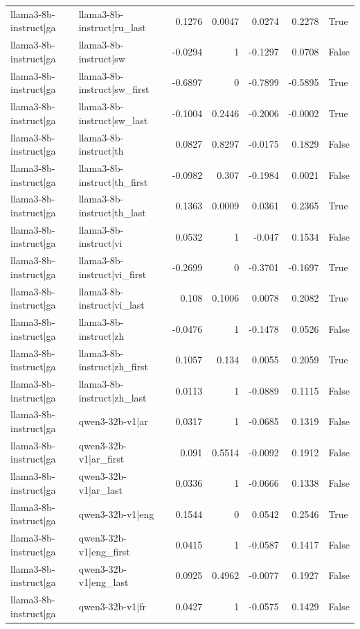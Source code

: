 \begin{table}
\begin{tabular}{l l r r r r l}
llama3-8b-instruct|ga & llama3-8b-instruct|ru_last & 0.1276 & 0.0047 & 0.0274 & 0.2278 & True \\
llama3-8b-instruct|ga & llama3-8b-instruct|sw & -0.0294 & 1 & -0.1297 & 0.0708 & False \\
llama3-8b-instruct|ga & llama3-8b-instruct|sw_first & -0.6897 & 0 & -0.7899 & -0.5895 & True \\
llama3-8b-instruct|ga & llama3-8b-instruct|sw_last & -0.1004 & 0.2446 & -0.2006 & -0.0002 & True \\
llama3-8b-instruct|ga & llama3-8b-instruct|th & 0.0827 & 0.8297 & -0.0175 & 0.1829 & False \\
llama3-8b-instruct|ga & llama3-8b-instruct|th_first & -0.0982 & 0.307 & -0.1984 & 0.0021 & False \\
llama3-8b-instruct|ga & llama3-8b-instruct|th_last & 0.1363 & 0.0009 & 0.0361 & 0.2365 & True \\
llama3-8b-instruct|ga & llama3-8b-instruct|vi & 0.0532 & 1 & -0.047 & 0.1534 & False \\
llama3-8b-instruct|ga & llama3-8b-instruct|vi_first & -0.2699 & 0 & -0.3701 & -0.1697 & True \\
llama3-8b-instruct|ga & llama3-8b-instruct|vi_last & 0.108 & 0.1006 & 0.0078 & 0.2082 & True \\
llama3-8b-instruct|ga & llama3-8b-instruct|zh & -0.0476 & 1 & -0.1478 & 0.0526 & False \\
llama3-8b-instruct|ga & llama3-8b-instruct|zh_first & 0.1057 & 0.134 & 0.0055 & 0.2059 & True \\
llama3-8b-instruct|ga & llama3-8b-instruct|zh_last & 0.0113 & 1 & -0.0889 & 0.1115 & False \\
llama3-8b-instruct|ga & qwen3-32b-v1|ar & 0.0317 & 1 & -0.0685 & 0.1319 & False \\
llama3-8b-instruct|ga & qwen3-32b-v1|ar_first & 0.091 & 0.5514 & -0.0092 & 0.1912 & False \\
llama3-8b-instruct|ga & qwen3-32b-v1|ar_last & 0.0336 & 1 & -0.0666 & 0.1338 & False \\
llama3-8b-instruct|ga & qwen3-32b-v1|eng & 0.1544 & 0 & 0.0542 & 0.2546 & True \\
llama3-8b-instruct|ga & qwen3-32b-v1|eng_first & 0.0415 & 1 & -0.0587 & 0.1417 & False \\
llama3-8b-instruct|ga & qwen3-32b-v1|eng_last & 0.0925 & 0.4962 & -0.0077 & 0.1927 & False \\
llama3-8b-instruct|ga & qwen3-32b-v1|fr & 0.0427 & 1 & -0.0575 & 0.1429 & False \\

\end{tabular}
\end{table}
